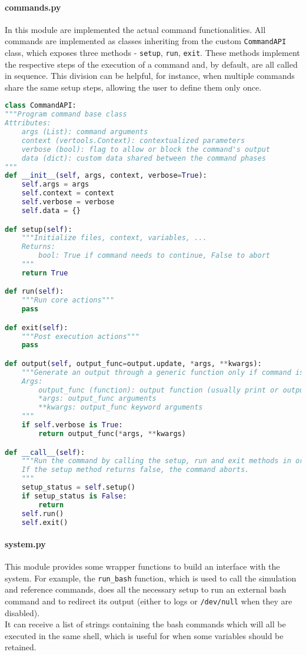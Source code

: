 \paragraph{commands.py} In this module are implemented the actual command functionalities. All commands are implemented as classes inheriting from the custom \texttt{CommandAPI} class, which exposes three methods - \texttt{setup}, \texttt{run}, \texttt{exit}. These methods implement the respective steps of the execution of a command and, by default, are all called in sequence. This division can be helpful, for instance, when multiple commands share the same setup steps, allowing the user to define them only once.
\begin{lstlisting}[language=Python]
class CommandAPI:
"""Program command base class
Attributes:
    args (List): command arguments
    context (vertools.Context): contextualized parameters
    verbose (bool): flag to allow or block the command's output
    data (dict): custom data shared between the command phases
"""
def __init__(self, args, context, verbose=True):
    self.args = args
    self.context = context
    self.verbose = verbose
    self.data = {}

def setup(self):
    """Initialize files, context, variables, ...
    Returns:
        bool: True if command needs to continue, False to abort
    """
    return True

def run(self):
    """Run core actions"""
    pass

def exit(self):
    """Post execution actions"""
    pass

def output(self, output_func=output.update, *args, **kwargs):
    """Generate an output through a generic function only if command is set to verbose
    Args:
        output_func (function): output function (usually print or output.update)
        *args: output_func arguments
        **kwargs: output_func keyword arguments
    """
    if self.verbose is True:
        return output_func(*args, **kwargs)

def __call__(self):
    """Run the command by calling the setup, run and exit methods in order.
    If the setup method returns false, the command aborts.
    """
    setup_status = self.setup()
    if setup_status is False:
        return
    self.run()
    self.exit()
\end{lstlisting}

\paragraph{system.py} This module provides some wrapper functions to build an interface with the system. For example, the \texttt{run\_bash} function, which is used to call the simulation and reference commands, does all the necessary setup to run an external bash command and to redirect its output (either to logs or \texttt{/dev/null} when they are disabled).\\
It can receive a list of strings containing the bash commands which will all be executed in the same shell, which is useful for when some variables should be retained.

